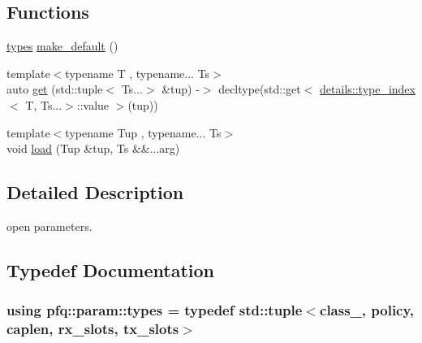 \subsection*{Functions}
\begin{DoxyCompactItemize}
\item 
\hyperlink{namespacepfq_1_1param_af3ddce79237872fa77ef9a45bdb48acd}{types} \hyperlink{namespacepfq_1_1param_af1fd1aeb980688527db587b35f55abf2}{make\+\_\+default} ()
\item 
{\footnotesize template$<$typename T , typename... Ts$>$ }\\auto \hyperlink{namespacepfq_1_1param_a09da2abc1a228d7f77c35bed3bdb157d}{get} (std\+::tuple$<$ Ts...$>$ \&tup) -\/$>$ decltype(std\+::get$<$ \hyperlink{structpfq_1_1param_1_1details_1_1type__index}{details\+::type\+\_\+index}$<$ T, Ts...$>$\+::value $>$(tup))
\item 
{\footnotesize template$<$typename Tup , typename... Ts$>$ }\\void \hyperlink{namespacepfq_1_1param_aeabbdcec021e01a0a9321678fea99d8f}{load} (Tup \&tup, Ts \&\&...arg)
\end{DoxyCompactItemize}


\subsection{Detailed Description}
open parameters. 

\subsection{Typedef Documentation}
\hypertarget{namespacepfq_1_1param_af3ddce79237872fa77ef9a45bdb48acd}{
\subsubsection[{types}]{\setlength{\rightskip}{0pt plus 5cm}using {\bf pfq\+::param\+::types} = typedef std\+::tuple$<${\bf class\+\_\+}, {\bf policy}, {\bf caplen}, {\bf rx\+\_\+slots}, {\bf tx\+\_\+slots}$>$}}\label{namespacepfq_1_1param_af3ddce79237872fa77ef9a45bdb48acd}


